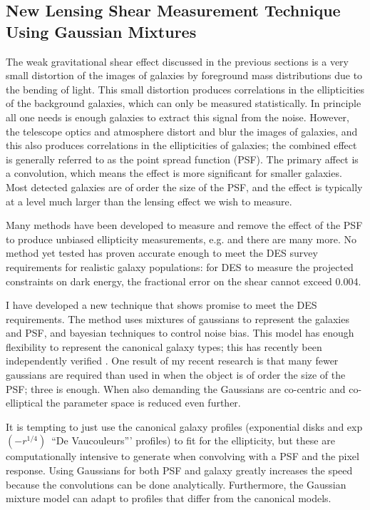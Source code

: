\documentclass[12pt]{article}
\newcommand{\devauc}{De Vaucouleurs'}
\newcommand{\devprof}{exp$(-r^{1/4})$}
\begin{document}
\subsection{New Lensing Shear Measurement Technique Using Gaussian Mixtures}
\label{sec:gmix}

The weak gravitational shear effect discussed in the previous sections is a
very small distortion of the images of galaxies by foreground mass
distributions due to the bending of light.  This small distortion produces
correlations in the ellipticities of the background galaxies, which can only be
measured statistically.  In principle all one needs is enough galaxies to
extract this signal from the noise.  However, the telescope optics and
atmosphere distort and blur the images of galaxies, and this also produces
correlations in the ellipticities of galaxies; the combined effect is generally
referred to as the point spread function (PSF). The primary affect is a
convolution, which means the effect is more significant for smaller galaxies.
Most detected galaxies are of order the size of the PSF, and the effect is
typically at a level much larger than the lensing effect we wish to measure.

Many methods have been developed to measure and remove the effect of the PSF to
produce unbiased ellipticity measurements, e.g.
\cite{ksb95,Bern02,Miller07,Melchior11} and there are many more.  No method yet
tested has proven accurate enough to meet the DES survey requirements for
realistic galaxy populations:  for DES to measure the projected constraints on
dark energy, the fractional error on the shear cannot exceed 0.004.

I have developed a new technique that shows promise to meet the DES
requirements.  The method uses mixtures of gaussians to represent the galaxies
and PSF, and bayesian techniques to control noise bias.  This model has enough
flexibility to represent the canonical galaxy types; this has recently been
independently verified \citep{HoggGMix12}.  One result of my recent research is
that many fewer gaussians are required than used in \cite{HoggGMix12} when the
object is of order the size of the PSF; three is enough.  When also demanding
the Gaussians are co-centric and co-elliptical the parameter space is reduced
even further.  

It is tempting to just use the canonical galaxy profiles (exponential disks and
\devprof\ ``\devauc'' profiles) to fit for the ellipticity, but these are
computationally intensive to generate when convolving with a PSF and the pixel
response.  Using Gaussians for both PSF and galaxy greatly increases the speed
because the convolutions can be done analytically.   Furthermore, the Gaussian
mixture model can adapt to profiles that differ from the canonical models.
\end{document}
